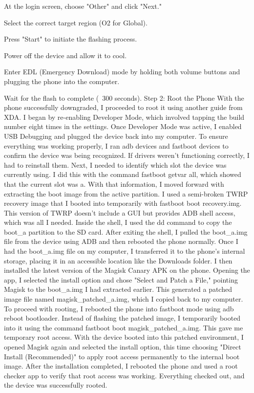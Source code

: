 At the login screen, choose "Other" and click "Next."


Select the correct target region (O2 for Global).


Press "Start" to initiate the flashing process.


Power off the device and allow it to cool.


Enter EDL (Emergency Download) mode by holding both volume buttons and plugging the phone into the computer.


Wait for the flash to complete (~300 seconds).
Step 2: Root the Phone
With the phone successfully downgraded, I proceeded to root it using another guide from XDA. I began by re-enabling Developer Mode, which involved tapping the build number eight times in the settings. Once Developer Mode was active, I enabled USB Debugging and plugged the device back into my computer. To ensure everything was working properly, I ran adb devices and fastboot devices to confirm the device was being recognized. If drivers weren’t functioning correctly, I had to reinstall them.
Next, I needed to identify which slot the device was currently using. I did this with the command fastboot getvar all, which showed that the current slot was a. With that information, I moved forward with extracting the boot image from the active partition. I used a semi-broken TWRP recovery image that I booted into temporarily with fastboot boot recovery.img. This version of TWRP doesn’t include a GUI but provides ADB shell access, which was all I needed. Inside the shell, I used the dd command to copy the boot_a partition to the SD card. After exiting the shell, I pulled the boot_a.img file from the device using ADB and then rebooted the phone normally.
Once I had the boot_a.img file on my computer, I transferred it to the phone’s internal storage, placing it in an accessible location like the Downloads folder. I then installed the latest version of the Magisk Canary APK on the phone. Opening the app, I selected the install option and chose "Select and Patch a File," pointing Magisk to the boot_a.img I had extracted earlier. This generated a patched image file named magisk_patched_a.img, which I copied back to my computer.
To proceed with rooting, I rebooted the phone into fastboot mode using adb reboot bootloader. Instead of flashing the patched image, I temporarily booted into it using the command fastboot boot magisk_patched_a.img. This gave me temporary root access. With the device booted into this patched environment, I opened Magisk again and selected the install option, this time choosing "Direct Install (Recommended)" to apply root access permanently to the internal boot image.
After the installation completed, I rebooted the phone and used a root checker app to verify that root access was working. Everything checked out, and the device was successfully rooted.



